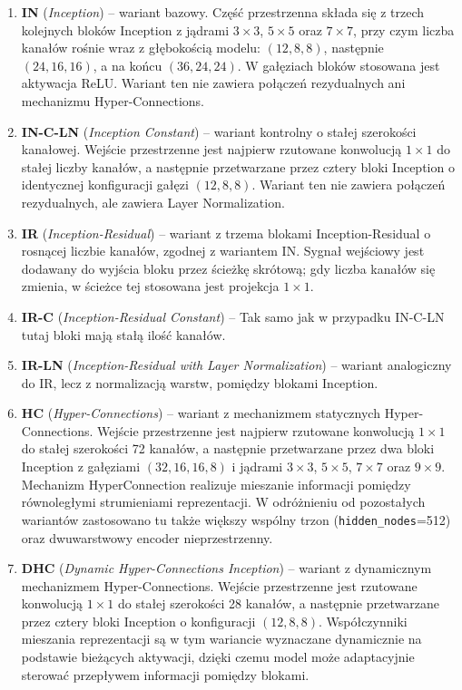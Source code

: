 \begin{enumerate}
	\item \textbf{IN} (\emph{Inception}) -- wariant bazowy. Część przestrzenna
	składa się z trzech kolejnych bloków Inception z jądrami
	\(3\times3\), \(5\times5\) oraz \(7\times7\), przy czym liczba kanałów
	rośnie wraz z głębokością modelu:
	\((12,8,8)\), następnie \((24,16,16)\), a na końcu \((36,24,24)\).
	W gałęziach bloków stosowana jest aktywacja ReLU. Wariant ten nie
	zawiera połączeń rezydualnych ani mechanizmu Hyper-Connections.
	
	\item \textbf{IN-C-LN} (\emph{Inception Constant}) -- wariant kontrolny
	o stałej szerokości kanałowej. Wejście przestrzenne jest najpierw
	rzutowane konwolucją \(1\times1\) do stałej liczby kanałów, a następnie
	przetwarzane przez cztery bloki Inception o identycznej konfiguracji
	gałęzi \((12,8,8)\). Wariant ten nie zawiera połączeń rezydualnych, ale zawiera Layer Normalization.
	
	\item \textbf{IR} (\emph{Inception-Residual}) -- wariant z trzema blokami Inception-Residual o rosnącej liczbie kanałów, zgodnej z wariantem IN. Sygnał wejściowy jest dodawany do wyjścia bloku przez ścieżkę skrótową; gdy liczba kanałów się zmienia, w ścieżce tej stosowana jest projekcja \(1\times1\).
	
	\item \textbf{IR-C} (\emph{Inception-Residual Constant}) -- Tak samo jak w przypadku IN-C-LN tutaj bloki mają stałą ilość kanałów.
	
	\item \textbf{IR-LN} (\emph{Inception-Residual with Layer Normalization}) -- wariant analogiczny do IR, lecz z normalizacją warstw, pomiędzy blokami Inception.
	
	\item \textbf{HC} (\emph{Hyper-Connections}) -- wariant
	z mechanizmem statycznych Hyper-Connections. Wejście przestrzenne
	jest najpierw rzutowane konwolucją \(1\times1\) do stałej szerokości
	72 kanałów, a następnie przetwarzane przez dwa bloki Inception
	z gałęziami \((32,16,16,8)\) i jądrami
	\(3\times3\), \(5\times5\), \(7\times7\) oraz \(9\times9\).
	Mechanizm HyperConnection realizuje mieszanie informacji pomiędzy
	równoległymi strumieniami reprezentacji. W odróżnieniu od pozostałych
	wariantów zastosowano tu także większy wspólny trzon
	(\texttt{hidden\_nodes}=512) oraz dwuwarstwowy encoder
	nieprzestrzenny.
	
	\item \textbf{DHC} (\emph{Dynamic Hyper-Connections Inception}) --
	wariant z dynamicznym mechanizmem Hyper-Connections. Wejście przestrzenne
	jest rzutowane konwolucją \(1\times1\) do stałej szerokości 28 kanałów,
	a następnie przetwarzane przez cztery bloki Inception o konfiguracji
	\((12,8,8)\). Współczynniki mieszania reprezentacji są w tym wariancie
	wyznaczane dynamicznie na podstawie bieżących aktywacji, dzięki czemu
	model może adaptacyjnie sterować przepływem informacji pomiędzy blokami.
\end{enumerate}

